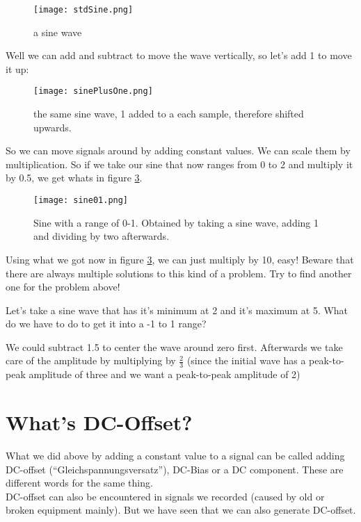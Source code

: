 \begin{figure}[h!]
	\centering
	\texttt{[image: stdSine.png]}
	\caption[a sine wave]
	{a sine wave}
	\label{fig:aSine}
\end{figure}
Well we can add and subtract to move the wave vertically, so let's add 1 to move it up:

\begin{figure}[h!]
	\centering
	\texttt{[image: sinePlusOne.png]}
	\caption[a sine wave]
	{the same sine wave, 1 added to a each sample, therefore shifted upwards.}
	\label{fig:aShiftedSine}
\end{figure}

So we can move signals around by adding constant values. We can scale them by multiplication. So if we take our sine that now ranges from 0 to 2 and multiply it by 0.5, we get whats in figure \ref{fig:sine01}.

\begin{figure}[h!]
 	\centering
 	\texttt{[image: sine01.png]}
 	\caption[sine 0 to 1]
 	{Sine with a range of 0-1. Obtained by taking a sine wave, adding 1 and dividing by two afterwards.}
 	\label{fig:sine01}
 \end{figure} 

Using what we got now in figure \ref{fig:sine01}, we can just multiply by 10, easy! Beware that there are always multiple solutions to this kind of a problem. Try to find another one for the problem above!

\begin{question}
Let's take a sine wave that has it's minimum at 2 and it's maximum at 5. What do we have to do to get it into a -1 to 1 range?
\end{question}
\begin{Answer}
We could subtract 1.5 to center the wave around zero first. Afterwards we take care of the amplitude by multiplying by $\frac{2}{3}$ (since the initial wave has a peak-to-peak amplitude of three and we want a peak-to-peak amplitude of 2)
\end{Answer}



\section{What's DC-Offset?}

What we did above by adding a constant value to a signal can be called adding DC-offset (``Gleichspannungsversatz''), DC-Bias or a DC component. These are different words for the same thing.\\
DC-offset can also be encountered in signals we recorded (caused by old or broken equipment mainly). But we have seen that we can also generate DC-offset.

